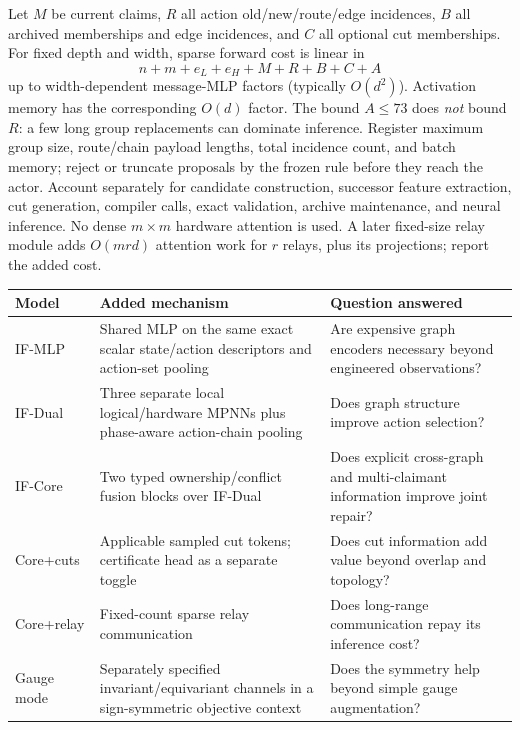 \documentclass[11pt,a4paper]{article}
\theoremstyle{definition}\newtheorem{definition}[proposition]{Definition}
\begin{document}
Let \(M\) be current claims, \(R\) all action old/new/route/edge incidences, \(B\) all archived memberships and edge incidences, and \(C\) all optional cut memberships. For fixed depth and width, sparse forward cost is linear in
\[
 n+m+e_L+e_H+M+R+B+C+A
\]
up to width-dependent message-MLP factors (typically \(O(d^2)\)). Activation memory has the corresponding \(O(d)\) factor. The bound \(A\le73\) does \emph{not} bound \(R\): a few long group replacements can dominate inference. Register maximum group size, route/chain payload lengths, total incidence count, and batch memory; reject or truncate proposals by the frozen rule before they reach the actor. Account separately for candidate construction, successor feature extraction, cut generation, compiler calls, exact validation, archive maintenance, and neural inference. No dense \(m\times m\) hardware attention is used. A later fixed-size relay module adds \(O(mrd)\) attention work for \(r\) relays, plus its projections; report the added cost.

\begin{center}
\small
\begin{tabularx}{\textwidth}{@{}p{}XX@{}}
\toprule
Model & Added mechanism & Question answered \\
\midrule
IF-MLP & Shared MLP on the same exact scalar state/action descriptors and action-set pooling & Are expensive graph encoders necessary beyond engineered observations? \\
IF-Dual & Three separate local logical/hardware MPNNs plus phase-aware action-chain pooling & Does graph structure improve action selection? \\
IF-Core & Two typed ownership/conflict fusion blocks over IF-Dual & Does explicit cross-graph and multi-claimant information improve joint repair? \\
Core+cuts & Applicable sampled cut tokens; certificate head as a separate toggle & Does cut information add value beyond overlap and topology? \\
Core+relay & Fixed-count sparse relay communication & Does long-range communication repay its inference cost? \\
Gauge mode & Separately specified invariant/equivariant channels in a sign-symmetric objective context & Does the symmetry help beyond simple gauge augmentation? \\
\bottomrule
\end{tabularx}
\end{center}
\end{document}
